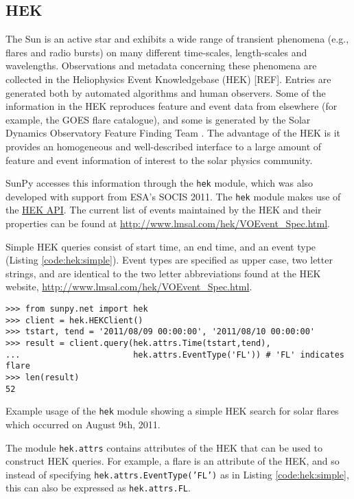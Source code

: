\subsection{HEK}\label{ssec:hek}

The Sun is an active star and exhibits a wide range of transient phenomena 
(e.g., flares and radio bursts) on many different time-scales, length-scales and 
wavelengths. Observations and metadata concerning these phenomena are collected 
in the Heliophysics Event Knowledgebase (HEK) [REF].  Entries are generated both by 
automated algorithms and human observers.  Some of the information in the HEK 
reproduces feature and event data from elsewhere (for example, the GOES flare catalogue),
and some is generated by the Solar Dynamics Observatory Feature Finding Team 
\citep{martens2012}.  The advantage of the HEK is it 
provides an homogeneous and well-described interface to a large amount of 
feature and event information of interest to the solar physics community.


SunPy accesses this information through the \texttt{hek} module, which was also
developed with support from ESA's SOCIS 2011.  The \texttt{hek} module makes 
use of the 
\href{http://vso.stanford.edu/hekwiki/ApplicationProgrammingInterface?action=print}{HEK
 API}.
The current list of events maintained by the HEK and their properties can be 
found at \url{http://www.lmsal.com/hek/VOEvent_Spec.html}.

Simple HEK queries consist of start time, an end time, and an event type 
(Listing \ref{code:hek:simple}). Event types are specified as upper case, 
two letter strings, and are 
identical to the two letter abbreviations found at the HEK website, 
\url{http://www.lmsal.com/hek/VOEvent_Spec.html}.

\begin{listing}[H]
\begin{verbatim}
>>> from sunpy.net import hek
>>> client = hek.HEKClient()
>>> tstart, tend = '2011/08/09 00:00:00', '2011/08/10 00:00:00'
>>> result = client.query(hek.attrs.Time(tstart,tend), 
...                       hek.attrs.EventType('FL')) # 'FL' indicates flare
>>> len(result)
52
\end{verbatim}
\caption{Example usage of the \texttt{hek} module showing a simple HEK search for solar flares
which occurred on August 9th, 2011.}
\label{code:hek:simple}
\end{listing}

The module \texttt{hek.attrs} contains attributes of the HEK that can be used to
construct HEK queries.  For example, a flare is an attribute of the HEK, and so 
instead of specifying \texttt{hek.attrs.EventType('FL')} as in Listing 
\ref{code:hek:simple}, this can also be expressed as \texttt{hek.attrs.FL}. 

